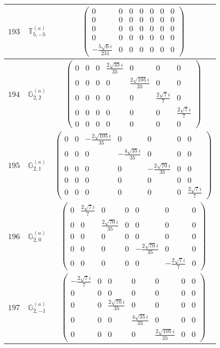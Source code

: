 \documentclass[fleqn,8pt,landscape]{jsarticle}
\begin{document}
\begin{center}
\begin{longtable}{ccc}
$ 193 $ & $ \mathbb{T}_{5,-5}^{(a)} $ & $ \begin{pmatrix} 0 & 0 & 0 & 0 & 0 & 0 & 0 \\ 0 & 0 & 0 & 0 & 0 & 0 & 0 \\ 0 & 0 & 0 & 0 & 0 & 0 & 0 \\ 0 & 0 & 0 & 0 & 0 & 0 & 0 \\ - \frac{5 \sqrt{6} i}{231} & 0 & 0 & 0 & 0 & 0 & 0 \end{pmatrix} $ \\ \hline
$ 194 $ & $ \mathbb{G}_{2,2}^{(a)} $ & $ \begin{pmatrix} 0 & 0 & 0 & \frac{2 \sqrt{35} i}{35} & 0 & 0 & 0 \\ 0 & 0 & 0 & 0 & \frac{2 \sqrt{105} i}{35} & 0 & 0 \\ 0 & 0 & 0 & 0 & 0 & \frac{2 \sqrt{7} i}{7} & 0 \\ 0 & 0 & 0 & 0 & 0 & 0 & \frac{2 \sqrt{7} i}{7} \\ 0 & 0 & 0 & 0 & 0 & 0 & 0 \end{pmatrix} $ \\ \hline
$ 195 $ & $ \mathbb{G}_{2,1}^{(a)} $ & $ \begin{pmatrix} 0 & 0 & - \frac{2 \sqrt{105} i}{35} & 0 & 0 & 0 & 0 \\ 0 & 0 & 0 & - \frac{4 \sqrt{35} i}{35} & 0 & 0 & 0 \\ 0 & 0 & 0 & 0 & - \frac{2 \sqrt{70} i}{35} & 0 & 0 \\ 0 & 0 & 0 & 0 & 0 & 0 & 0 \\ 0 & 0 & 0 & 0 & 0 & 0 & \frac{2 \sqrt{7} i}{7} \end{pmatrix} $ \\ \hline
$ 196 $ & $ \mathbb{G}_{2,0}^{(a)} $ & $ \begin{pmatrix} 0 & \frac{2 \sqrt{7} i}{7} & 0 & 0 & 0 & 0 & 0 \\ 0 & 0 & \frac{2 \sqrt{70} i}{35} & 0 & 0 & 0 & 0 \\ 0 & 0 & 0 & 0 & 0 & 0 & 0 \\ 0 & 0 & 0 & 0 & - \frac{2 \sqrt{70} i}{35} & 0 & 0 \\ 0 & 0 & 0 & 0 & 0 & - \frac{2 \sqrt{7} i}{7} & 0 \end{pmatrix} $ \\ \hline
$ 197 $ & $ \mathbb{G}_{2,-1}^{(a)} $ & $ \begin{pmatrix} - \frac{2 \sqrt{7} i}{7} & 0 & 0 & 0 & 0 & 0 & 0 \\ 0 & 0 & 0 & 0 & 0 & 0 & 0 \\ 0 & 0 & \frac{2 \sqrt{70} i}{35} & 0 & 0 & 0 & 0 \\ 0 & 0 & 0 & \frac{4 \sqrt{35} i}{35} & 0 & 0 & 0 \\ 0 & 0 & 0 & 0 & \frac{2 \sqrt{105} i}{35} & 0 & 0 \end{pmatrix} $ \\ \hline

\end{longtable}
\end{center}
\end{document}
